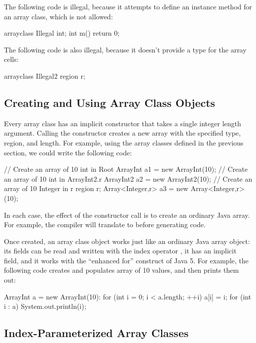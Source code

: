 The following code is illegal, because it attempts to define an
instance method for an array class, which is not allowed:
%
\begin{dpjlisting}
arrayclass Illegal {
  int;
  int m() { return 0; }
}
\end{dpjlisting}
%
The following code is also illegal, because it doesn't provide a type
for the array cells:
%
\begin{dpjlisting}
arrayclass Illegal2 {
  region r;
}
\end{dpjlisting}

\subsection{Creating and Using Array Class Objects
\label{sec:array-classes:creating}}

Every array class has an implicit constructor that takes a single
integer length argument.  Calling the constructor creates a new array
with the specified type, region, and length.  For example, using the
array classes defined in the previous section, we could write the
following code:
%
\begin{dpjlisting}
// Create an array of 10 int in Root
ArrayInt a1 = new ArrayInt(10);
// Create an array of 10 int in ArrayInt2.r
ArrayInt2 a2 = new ArrayInt2(10);
// Create an array of 10 Integer in r
region r;
Array<Integer,r> a3 = new Array<Integer,r>(10);
\end{dpjlisting}
%
In each case, the effect of the constructor call is to create an
ordinary Java array.  For example, the compiler will translate
 to  before generating code.

Once created, an array class object works just like an ordinary Java
array object: its fields can be read and written with the index
operator \kwd{[$\ldots$]}, it has an implicit  field, and
it works with the ``enhanced for'' construct of Java 5.  For example,
the following code creates and populates array of 10  values,
and then prints them out:
%
\begin{dpjlisting}
ArrayInt a = new ArrayInt(10):
for (int i = 0; i < a.length; ++i)
  a[i] = i;
for (int i : a)
  System.out.println(i);
\end{dpjlisting}
%

\subsection{Index-Parameterized Array Classes
\label{sec:array-classes:ipa}}

